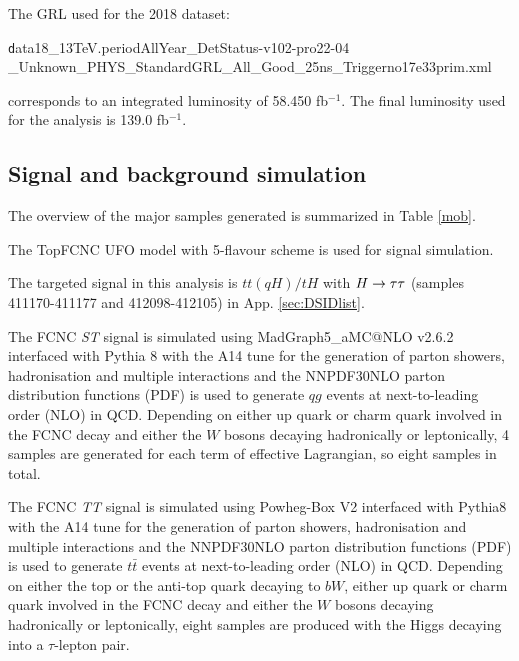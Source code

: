 The GRL used for the 2018 dataset:

\begin{centering}
{\texttt  data18\_13TeV.periodAllYear\_DetStatus-v102-pro22-04\\\_Unknown\_PHYS\_StandardGRL\_All\_Good\_25ns\_Triggerno17e33prim.xml}

\end{centering}
corresponds to an integrated luminosity of 58.450 fb$^{-1}$. The final luminosity used for the analysis is 139.0 fb$^{-1}$.

\subsection{Signal and background simulation}
\label{sec:generator}

The overview of the major samples generated is summarized in Table \ref{mob}.

The TopFCNC UFO model \cite{FCNC_UFO1,FCNC_UFO2} with 5-flavour scheme is used for signal simulation.

The targeted signal in this analysis is $tt(qH)/tH$ with $H \rightarrow \tau\tau$ (samples 411170-411177 and 412098-412105) in App. \ref{sec:DSIDlist}.

The FCNC \textit{ST} signal is simulated using MadGraph5\_aMC@NLO v2.6.2 \cite{MG5} interfaced with Pythia 8 \cite{Pythia8} with the A14 tune \cite{A14} for the generation of parton showers, hadronisation and multiple interactions and the NNPDF30NLO \cite{NNPDF30NLO} parton distribution functions (PDF) is used to generate $qg$ events at next-to-leading order (NLO) in QCD. Depending on either up quark or charm quark involved in the FCNC decay and either the $W$ bosons decaying hadronically or leptonically, 4 samples are generated for each term of effective Lagrangian, so eight samples in total.

The FCNC \textit{TT} signal is simulated using Powheg-Box \cite{Powheg} V2 interfaced with Pythia8 \cite{Pythia8} with the A14 tune \cite{A14} for the generation of parton showers, hadronisation and multiple interactions and the NNPDF30NLO \cite{NNPDF30NLO} parton distribution functions (PDF) is used to generate $t\bar{t}$ events at next-to-leading order (NLO) in QCD. Depending on either the top or the anti-top quark decaying to $bW$, either up quark or charm quark involved in the FCNC decay and either the $W$ bosons decaying hadronically or leptonically, eight samples are produced with the Higgs decaying into a $\tau$-lepton pair.

